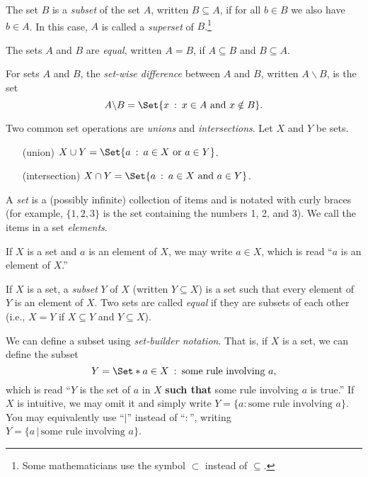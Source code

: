 \begin{SaveDefinition}[
		key=SubsetSuperset,
		title={Subset \& Superset}
	]
	The set $B$ is a \emph{subset} of the set $A$, written $B\subseteq A$, if for all
	$b\in B$ we also have $b\in A$.  In this case, $A$ is called a \emph{superset}
	of $B$.\footnote{
		Some mathematicians use the symbol $\subset$ instead of $\subseteq$.}
\end{SaveDefinition}
\begin{SaveDefinition}[
		key=SetEquality,
		title={Set Equality}
	]
	The sets $A$ and $B$ are \emph{equal}, written $A=B$, if $A\subseteq B$ and $B\subseteq A$.
\end{SaveDefinition}
\begin{SaveDefinition}[
		key=SetSubtraction,
		title={Set Subtraction}
	]
	For sets $A$ and $B$, the \emph{set-wise difference} between $A$ and $B$,
	written $A\backslash B$, is the set
	\[
		A\backslash B = \Set{x\given x\in A\text{ and }x\notin B}.
	\]
\end{SaveDefinition}
\begin{SaveDefinition}[
		key=UnionsIntersections,
		title={Unions \& Intersections}
	]
	Two common set operations are \emph{unions} and \emph{intersections}.
	Let $X$ and $Y$ be sets.

	\hfill\begin{minipage}{\dimexpr\textwidth-3cm}
	\begin{itemize}
		\item[(union)] $X\cup Y = \Set{ a \given a\in X\text{ or }a\in Y}$.
		\item[(intersection)] $X\cap Y = \Set{ a \given a\in X\text{ and }a\in Y}$.
	\end{itemize}
	\end{minipage}
\end{SaveDefinition}

\begin{SaveDefinition}[key=Set, title={Set}]
	A \emph{set} is a (possibly infinite) collection of items and is notated
	with curly braces (for example, $\{1,2,3\}$ is the set containing the
	numbers 1, 2, and 3). We call the items in a set
	\emph{elements}.

	If $X$ is a set and $a$ is an element of $X$, we may write $a\in X$,
	which is read ``$a$ is an element of $X$.''

	If $X$ is a set, a
	\emph{subset} $Y$ of $X$ (written $Y\subseteq X$) is a set such that
	every element of $Y$ is an element of $X$. Two sets are called
	\emph{equal} if they are subsets of each other (i.e., $X=Y$ if $X\subseteq
	Y$ and $Y\subseteq X$).

	We can define a subset using
	\emph{set-builder notation}. That is, if $X$ is a set, we can define the
	subset
	\[
		Y= \Set*{a\in X \given \text{some rule involving }a},
	\]
	 which is read ``$Y$ is the set of $a$ in $X$ {\bf such that} some rule
	involving $a$ is true.'' If $X$ is intuitive, we may omit it and simply write
	$Y=\{a:\text{some rule involving }a\}$. You may equivalently use ``$|$''
	instead of ``$:$'', writing $Y=\{a\,|\,\text{some rule involving }a\}$.
\end{SaveDefinition}


